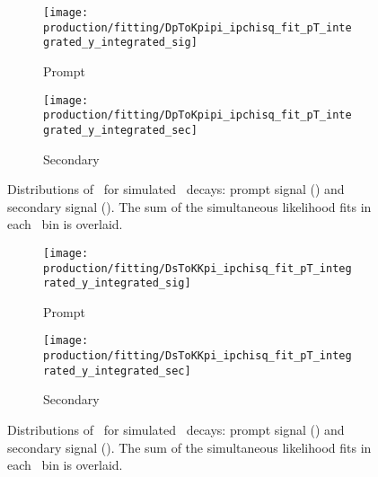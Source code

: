 \begin{figure}
  \begin{subfigure}[b]{0.5\textwidth}
    \centering
    \texttt{[image: production/fitting/DpToKpipi\_ipchisq\_fit\_pT\_integrated\_y\_integrated\_sig]}
    \caption{Prompt}
    \label{fig:prod:fitting:prefits:DpToKpipi:prompt}
  \end{subfigure}
  \begin{subfigure}[b]{0.5\textwidth}
    \centering
    \texttt{[image: production/fitting/DpToKpipi\_ipchisq\_fit\_pT\_integrated\_y\_integrated\_sec]}
    \caption{Secondary}
    \label{fig:prod:fitting:prefits:DpToKpipi:secondary}
  \end{subfigure}
  \caption{%
    Distributions of \lnipchisq\ for simulated \DpToKpipi\ decays: prompt 
    signal \PDplus () and 
    secondary signal \PDplus 
    ().
    The sum of the simultaneous likelihood fits in each \pTy\ bin is overlaid.
  }
  \label{fig:prod:fitting:prefits:DpToKpipi}
\end{figure}

\begin{figure}
  \begin{subfigure}[b]{0.5\textwidth}
    \centering
    \texttt{[image: production/fitting/DsToKKpi\_ipchisq\_fit\_pT\_integrated\_y\_integrated\_sig]}
    \caption{Prompt}
    \label{fig:prod:fitting:prefits:DsToKKpi:prompt}
  \end{subfigure}
  \begin{subfigure}[b]{0.5\textwidth}
    \centering
    \texttt{[image: production/fitting/DsToKKpi\_ipchisq\_fit\_pT\_integrated\_y\_integrated\_sec]}
    \caption{Secondary}
    \label{fig:prod:fitting:prefits:DsToKKpi:secondary}
  \end{subfigure}
  \caption{%
    Distributions of \lnipchisq\ for simulated \DspTophipi\ decays: prompt 
    signal \PDsplus () and 
    secondary signal \PDsplus 
    ().
    The sum of the simultaneous likelihood fits in each \pTy\ bin is overlaid.
  }
  \label{fig:prod:fitting:prefits:DsToKKpi}
\end{figure}

